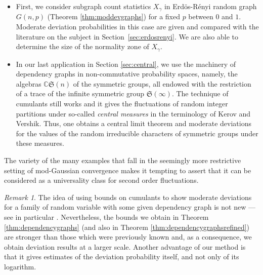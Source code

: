 \documentclass[12pt,a4paper,reqno]{amsart}
\theoremstyle{remark}
\newtheorem{remark}[lemma]{Remark}
\newcommand{\C}{\mathbb{C}}
\newcommand{\sym}{\mathfrak{S}}
\begin{document}
\begin{itemize}
    \item First, we consider subgraph count statistics $X_\gamma$ in Erd\"os-R\'enyi random graph $G(n,p)$ (Theorem \ref{thm:moddevgraphs}) for a fixed $p$ between $0$ and $1$. 
        Moderate deviation probabilities in this case are given and compared with the literature on the subject in Section~\ref{sec:erdosrenyi}. We are also able to determine the size of the normality zone of $X_\gamma$.\vspace{2mm}

    \item In our last application in Section \ref{sec:central}, we use the machinery of depen\-den\-cy gra\-phs in non-commutative probability spaces, namely, the algebras $\C\sym(n)$ of the symmetric groups, all endowed with the restriction of a trace of the infinite symmetric group $\sym(\infty)$. The technique of cumulants still works and it gives the fluctuations of random integer partitions under so-called {\em central measures} in the terminology of Kerov and Vershik. Thus, one obtains a central limit theorem and moderate deviations for the values of the random irreducible characters of symmetric groups under these measures.\vspace{2mm}
\end{itemize}    
The variety of the many examples that fall in the seemingly more restrictive setting of mod-Gaussian convergence makes it tempting to assert that it can be considered as a universality class for second order fluctuations. 
\bigskip

\begin{remark}
The idea of using bounds on  cumulants to show moderate deviations for a family of random variable with some given dependency graph is not new --- see in particular \cite{DE12}. Nevertheless, the bounds we obtain in Theorem \ref{thm:dependencygraphs} (and also in Theorem \ref{thm:dependencygraphsrefined}) are stronger than those which were previously known and, as a consequence, we obtain deviation results at a larger scale. Another advantage of our method is that it gives estimates of the deviation probability itself,
and not only of its logarithm.
\end{remark}
\bigskip
\end{document}
